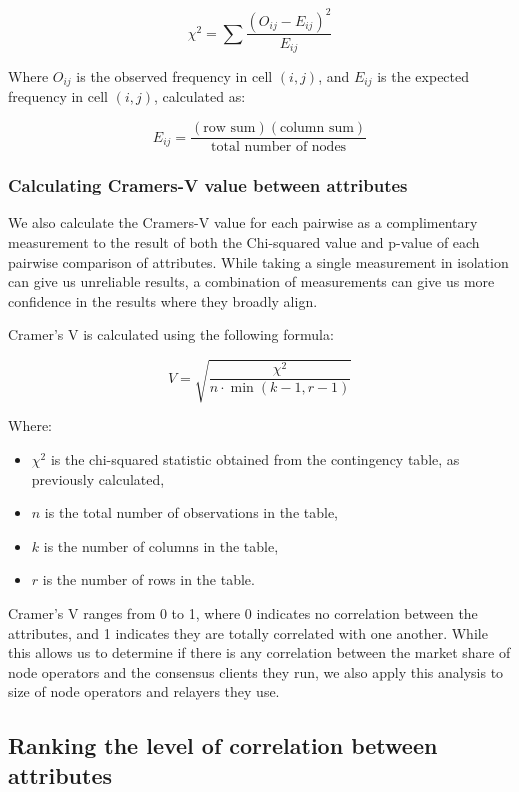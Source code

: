\documentclass[conference]{IEEEtran}
\begin{document}
\[
\chi^2 = \sum \frac{(O_{ij} - E_{ij})^2}{E_{ij}}
\]

Where $O_{ij}$ is the observed frequency in cell $(i, j)$, and $E_{ij}$ is the expected frequency in cell $(i, j)$, calculated as:

\[
E_{ij} = \frac{(\text{row sum})(\text{column sum})}{\text{total number of nodes}}
\]

\subsubsection{Calculating Cramers-V value between attributes}

We also calculate the Cramers-V value for each pairwise as a complimentary measurement to the result of both the Chi-squared value and p-value of each pairwise comparison of attributes.  While taking a single measurement in isolation can give us unreliable results, a combination of measurements can give us more confidence in the results where they broadly align.

Cramer's V is calculated using the following formula:

\[ V = \sqrt{\frac{\chi^2}{n \cdot \min(k-1, r-1)}} \]

Where:
\begin{itemize}
    \item $\chi^2$ is the chi-squared statistic obtained from the contingency table, as previously calculated,
    \item $n$ is the total number of observations in the table,
    \item $k$ is the number of columns in the table,
    \item $r$ is the number of rows in the table.
\end{itemize}

\vspace{8pt}

Cramer's V ranges from 0 to 1, where 0 indicates no correlation between the attributes, and 1 indicates they are totally correlated with one another.  While this allows us to determine if there is any correlation between the market share of node operators and the consensus clients they run, we also apply this analysis to size of node operators and relayers they use.

\subsection{Ranking the level of correlation between attributes}
\end{document}
